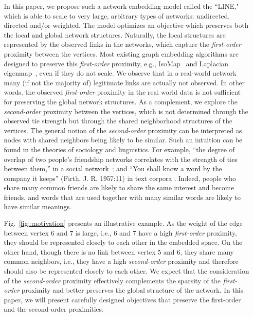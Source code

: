 \documentclass{sig-alternate-2013}
\begin{document}
In this paper, we propose such a network embedding model called the ``LINE," which is able to scale to very large, arbitrary types of networks: undirected, directed and/or weighted. The model optimizes an objective which preserves both the local and global network structures. 
Naturally, the local structures are represented by the observed links in the networks, which capture the \emph{first-order} proximity between the vertices. 
Most existing graph embedding algorithms are designed to preserve this \emph{first-order} proximity, e.g., IsoMap~\cite{tenenbaum2000global} and Laplacian eigenmap~\cite{belkin2001laplacian}, even if they do not scale. We observe that in a real-world network many (if not the majority of) legitimate links are actually not observed. In other words,  the observed \emph{first-order} proximity in the real world data is not sufficient for preserving the global network structures. As a complement, we explore the \emph{second-order} proximity between the vertices, which is not determined through the observed tie strength but through the shared neighborhood structures of the vertices.  
The general notion of the \textit{second-order} proximity can be interpreted as nodes with shared neighbors being likely to be similar. Such an intuition can be found in the theories of sociology and linguistics. For example, ``the degree of overlap of two people's friendship networks correlates with the strength of ties between them,'' in a social network~\cite{granovetter1973strength}; and ``You shall know a word by the company it keeps'' (Firth, J. R. 1957:11) in text corpora \cite{Firth1957}. Indeed, people who share many common friends are likely to share the same interest and become friends, and words that are used together with many similar words are likely to have similar meanings. 

Fig.~\ref{fig::motivation} presents an illustrative example. As the weight of the edge between vertex 6 and 7 is large, i.e., 6 and 7 have a high \emph{first-order} proximity, they should be represented closely to each other in the embedded space. On the other hand, though there is no link between vertex 5 and 6, they share many common neighbors, i.e., they have a high \emph{second-order} proximity and therefore should also be represented closely to each other. We expect that the consideration of the \textit{second-order} proximity effectively complements the sparsity of the \textit{first-order} proximity and better preserves the global structure of the network. In this paper, we will present carefully designed objectives that preserve the first-order and the second-order proximities. 
\end{document}
